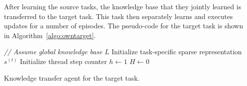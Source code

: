 After learning the source tasks, the knowledge base that they jointly learned is transferred to the target task.
This task then separately learns and executes updates for a number of episodes.
The pseudo-code for the target task is shown in Algorithm~\ref{algo:owntarget}.\\
\begin{algorithm}[htb]
\DontPrintSemicolon
\emph{// Assume global knowledge base $L$}\;
Initialize task-specific sparse representation $s^{(t)}$\;
Initialize thread step counter $h\gets 1$\;
$H \gets 0$\;
\caption[Knowledge transfer agent for the target task]{Knowledge transfer agent for the target task.}
\label{algo:owntarget}
\end{algorithm}
